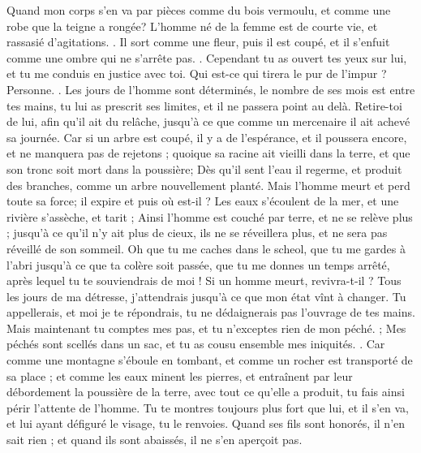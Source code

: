 \begin{multicols}{2}
Quand mon corps s'en va par pièces comme du bois vermoulu, et comme une robe que la teigne a rongée? 
\VerseOne{}L'homme né de la femme est de courte vie, et rassasié d'agitations. .
Il sort comme une fleur, puis il est coupé, et il s'enfuit comme une ombre qui ne s'arrête pas. .
Cependant tu as ouvert tes yeux sur lui, et tu me conduis en justice avec toi.
Qui est-ce qui tirera le pur de l'impur ? Personne. .
Les jours de l'homme sont déterminés, le nombre de ses mois est entre tes mains, tu lui as prescrit ses limites, et il ne passera point au delà.
Retire-toi de lui, afin qu'il ait du relâche, jusqu'à ce que comme un mercenaire il ait achevé sa journée.
Car si un arbre est coupé, il y a de l'espérance, et il poussera encore, et ne manquera pas de rejetons ; 
quoique sa racine ait vieilli dans la terre, et que son tronc soit mort dans la poussière;
Dès qu'il sent l'eau il regerme, et produit des branches, comme un arbre nouvellement planté. 
Mais l'homme meurt et perd toute sa force; il expire et puis où est-il ?
Les eaux s'écoulent de la mer, et une rivière s'assèche, et tarit ;
 Ainsi l'homme est couché par terre, et ne se relève plus ; jusqu'à ce qu'il n'y ait plus de cieux, ils ne se réveillera plus, et ne sera pas réveillé de son sommeil. 
Oh que tu me caches dans le scheol, que tu me gardes à l'abri jusqu'à ce que ta colère soit passée, que tu me donnes un temps arrêté, après lequel tu te souviendrais de moi !
Si un homme meurt, revivra-t-il ? Tous les jours de ma détresse, j'attendrais jusqu'à ce que mon état vînt à changer.
 Tu appellerais, et moi je te répondrais, tu ne dédaignerais pas l'ouvrage de tes mains.
Mais maintenant tu comptes mes pas, et tu n'exceptes rien de mon péché.  ;
Mes péchés sont scellés dans un sac, et tu as cousu ensemble mes iniquités. .
Car comme une montagne s'éboule en tombant, et comme un rocher est transporté de sa place ; 
 et comme les eaux minent les pierres, et entraînent par leur débordement la poussière de la terre, avec tout ce qu'elle a produit, tu fais ainsi périr l'attente de l'homme. 
Tu te montres toujours plus fort que lui, et il s'en va, et lui ayant défiguré le visage, tu le renvoies.
Quand ses fils sont honorés, il n'en sait rien ; et quand ils sont abaissés, il ne s'en aperçoit pas.

\end{multicols}
